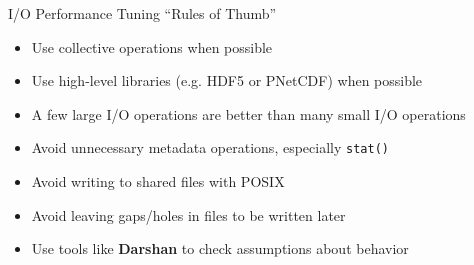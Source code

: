 \documentclass[compress,11pt,xcolor=svgnames,aspectratio=169]{beamer}
\begin{document}
\begin{frame}[fragile]{I/O Performance Tuning ``Rules of Thumb''}

\begin{itemize}
\setlength\itemsep{0.3cm}

  \item Use collective operations when possible

  \item Use high-level libraries (e.g. HDF5 or PNetCDF) when possible

  \item A few large I/O operations are better than many small I/O operations

  \item Avoid unnecessary metadata operations, especially \texttt{stat()}

  \item Avoid writing to shared files with POSIX

  \item Avoid leaving gaps/holes in files to be written later

  \item Use tools like \textbf{Darshan} to check assumptions about behavior

\end{itemize}

\end{frame}
\end{document}
